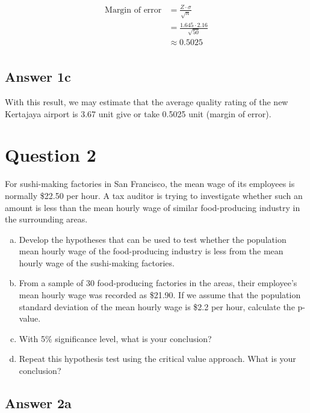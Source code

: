 \documentclass[
	11pt, %
]{assignment}
\begin{document}
\[
	\begin{aligned}
		\text{Margin of error} & = \frac{Z \cdot \sigma}{\sqrt{n}}    \\
		                       & = \frac{1.645 \cdot 2.16}{\sqrt{50}} \\
		                       & \approx 0.5025                       \\
	\end{aligned}
\]

\subsection*{Answer 1c}

With this result, we may estimate that the average quality rating of the new Kertajaya airport is 3.67 unit give or take 0.5025 unit (margin of error).

\pagebreak

\section*{Question 2}

\begin{problem}
For sushi-making factories in San Francisco, the mean wage of its employees is normally \$22.50 per hour. A tax auditor is trying to investigate whether such an amount is less than the mean hourly wage of similar food-producing industry in the surrounding areas.

\begin{enumerate}[a.]
	\item Develop the hypotheses that can be used to test whether the population mean hourly wage of the food-producing industry is less from the mean hourly wage of the sushi-making factories.
	\item From a sample of 30 food-producing factories in the areas, their employee's mean hourly wage was recorded as \$21.90. If we assume that the population standard deviation of the mean hourly wage is \$2.2 per hour, calculate the p-value.
	\item With 5\% significance level, what is your conclusion?
	\item Repeat this hypothesis test using the critical value approach. What is your conclusion?
\end{enumerate}
\end{problem}

\subsection*{Answer 2a}
\end{document}
